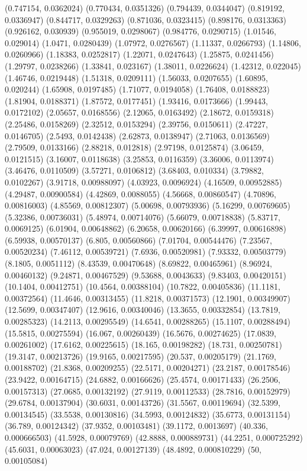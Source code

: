 {(0.747154, 0.0362024)
(0.770434, 0.0351326)
(0.794439, 0.0344047)
(0.819192, 0.0336947)
(0.844717, 0.0329263)
(0.871036, 0.0323415)
(0.898176, 0.0313363)
(0.926162, 0.030939)
(0.955019, 0.0298067)
(0.984776, 0.0290715)
(1.01546, 0.029014)
(1.0471, 0.0280439)
(1.07972, 0.0276567)
(1.11337, 0.0266793)
(1.14806, 0.0260966)
(1.18383, 0.0252817)
(1.22071, 0.0247643)
(1.25875, 0.0241456)
(1.29797, 0.0238266)
(1.33841, 0.023167)
(1.38011, 0.0226624)
(1.42312, 0.022045)
(1.46746, 0.0219448)
(1.51318, 0.0209111)
(1.56033, 0.0207655)
(1.60895, 0.020244)
(1.65908, 0.0197485)
(1.71077, 0.0194058)
(1.76408, 0.0188823)
(1.81904, 0.0188371)
(1.87572, 0.0177451)
(1.93416, 0.0173666)
(1.99443, 0.0172102)
(2.05657, 0.0168556)
(2.12065, 0.0163492)
(2.18672, 0.0159318)
(2.25486, 0.0158269)
(2.32512, 0.0153294)
(2.39756, 0.0150611)
(2.47227, 0.0146705)
(2.5493, 0.0142438)
(2.62873, 0.0138947)
(2.71063, 0.0136569)
(2.79509, 0.0133166)
(2.88218, 0.012818)
(2.97198, 0.0125874)
(3.06459, 0.0121515)
(3.16007, 0.0118638)
(3.25853, 0.0116359)
(3.36006, 0.0113974)
(3.46476, 0.0110509)
(3.57271, 0.0106812)
(3.68403, 0.010334)
(3.79882, 0.0102267)
(3.91718, 0.00988097)
(4.03923, 0.0096924)
(4.16509, 0.00952885)
(4.29487, 0.00900584)
(4.42869, 0.0088055)
(4.56668, 0.00860547)
(4.70896, 0.00816003)
(4.85569, 0.00812307)
(5.00698, 0.00793936)
(5.16299, 0.00769605)
(5.32386, 0.00736031)
(5.48974, 0.00714076)
(5.66079, 0.00718838)
(5.83717, 0.0069125)
(6.01904, 0.00648862)
(6.20658, 0.00620166)
(6.39997, 0.00616898)
(6.59938, 0.00570137)
(6.805, 0.00560866)
(7.01704, 0.00544476)
(7.23567, 0.00520234)
(7.46112, 0.00539721)
(7.6936, 0.00520981)
(7.93332, 0.00503779)
(8.1805, 0.0051112)
(8.43539, 0.00470648)
(8.69822, 0.00465961)
(8.96924, 0.00460132)
(9.24871, 0.00467529)
(9.53688, 0.0043633)
(9.83403, 0.00420151)
(10.1404, 0.00412751)
(10.4564, 0.00388104)
(10.7822, 0.00405836)
(11.1181, 0.00372564)
(11.4646, 0.00313455)
(11.8218, 0.00371573)
(12.1901, 0.00349907)
(12.5699, 0.00347407)
(12.9616, 0.00340046)
(13.3655, 0.00332854)
(13.7819, 0.00285323)
(14.2113, 0.00295549)
(14.6541, 0.00288265)
(15.1107, 0.00288494)
(15.5815, 0.00275594)
(16.067, 0.00260439)
(16.5676, 0.00274625)
(17.0839, 0.00261002)
(17.6162, 0.00225615)
(18.165, 0.00198282)
(18.731, 0.00250781)
(19.3147, 0.00213726)
(19.9165, 0.00217595)
(20.537, 0.00205179)
(21.1769, 0.00188702)
(21.8368, 0.00209255)
(22.5171, 0.00204271)
(23.2187, 0.00178546)
(23.9422, 0.00164715)
(24.6882, 0.00166626)
(25.4574, 0.00171433)
(26.2506, 0.00157313)
(27.0685, 0.00132192)
(27.9119, 0.00112533)
(28.7816, 0.00152979)
(29.6784, 0.00137904)
(30.6031, 0.00143726)
(31.5567, 0.00119694)
(32.5399, 0.00134545)
(33.5538, 0.00130816)
(34.5993, 0.00124832)
(35.6773, 0.00131154)
(36.789, 0.00124342)
(37.9352, 0.00103481)
(39.1172, 0.0013697)
(40.336, 0.000666503)
(41.5928, 0.00079769)
(42.8888, 0.000889731)
(44.2251, 0.000725292)
(45.6031, 0.00063023)
(47.024, 0.00127139)
(48.4892, 0.000810229)
(50, 0.00105084)
}


